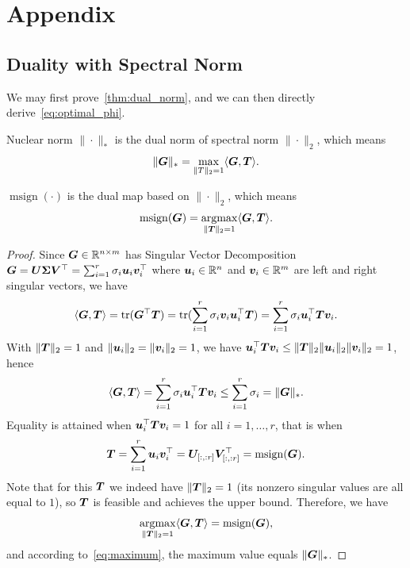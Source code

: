 
\section{Appendix}

\subsection{Duality with Spectral Norm}
\label{app:dual}

We may first prove~\cref{thm:dual_norm}, and we can then directly derive~\cref{eq:optimal_phi}.

\begin{theorem}\label{thm:dual_norm}
    Nuclear norm $\|\!\cdot\!\|_{*}$ is the dual norm of spectral norm $\|\!\cdot\!\|_{2}$,
    which means
    \[
        \|{\bm{G}}\|_{*}=\max_{\|T\|_2=1}\langle {\bm{G}},{\bm{T}}\rangle.
    \]

    $\operatorname{msign}(\cdot)$ is the dual map based on $\|\!\cdot\!\|_{2}$, which
    means
    \[
        \operatorname{msign}({\bm{G}})=\underset{\|{\bm{T}}\|_2=1}{\operatorname*{argmax}}\langle {\bm{G}},{\bm{T}}\rangle.
    \]
\end{theorem}

\begin{proof}
    Since ${\bm{G}} \in {\mathbb{R}}^{n\times m}$ has Singular Vector Decomposition ${\bm{G}} = {\bm{U}} {\bm{\Sigma}}
    {\bm{V}}^{\top}=\sum_{i=1}^{r}{\sigma}_{i}{\bm{u}}_{i}{\bm{v}}_{i}^{\top}$ where ${\bm{u}}_{i}\in{\mathbb{R}}
    ^{n}$ and ${\bm{v}}_{i}\in{\mathbb{R}}^{m}$ are left and right singular vectors, we
    have
    \begin{equation}
        \langle {\bm{G}},{\bm{T}} \rangle = \operatorname{tr}({\bm{G}}^{\top} {\bm{T}})=\operatorname{tr}(\sum_{i=1}^{r} {\sigma}
        _{i} {\bm{v}}_{i} {\bm{u}}_{i}^{\top} {\bm{T}})=\sum_{i=1}^{r} {\sigma}_{i}
        {\bm{u}}_{i}^{\top} {\bm{T}} {\bm{v}}_{i}.
    \end{equation}
    With $\|{\bm{T}}\|_{2}=1$ and $\|{\bm{u}}_{i}\|_{2}=\|{\bm{v}}_{i}\|_{2}=1$, we have ${\bm{u}}_{i}^{\top}
    {\bm{T}} {\bm{v}}_{i} \leq \|{\bm{T}}\|_{2} \|{\bm{u}}_{i}\|_{2}\|{\bm{v}}_{i}\|_{2} = 1$, hence
    \begin{equation}
        \label{eq:maximum}\langle {\bm{G}},{\bm{T}} \rangle=\sum_{i=1}^{r} {\sigma}_{i} {\bm{u}}_{i}^{\top}
        {\bm{T}} {\bm{v}}_{i} \leq \sum_{i=1}^{r} {\sigma}_{i} = \|{\bm{G}}\|_{*}.
    \end{equation}
    Equality is attained when ${\bm{u}}_{i}^{\top} {\bm{T}} {\bm{v}}_{i} = 1$ for all $i=1,\dots,r$, that
    is when
    \begin{equation}
        {\bm{T}} = \sum_{i=1}^{r} {\bm{u}}_{i} {\bm{v}}_{i}^{\top} = {\bm{U}}_{[:,:r]}{\bm{V}}_{[:,:r]}^{\top}=\operatorname{msign}
        ({\bm{G}}).
    \end{equation}
    Note that for this ${\bm{T}}$ we indeed have $\|{\bm{T}}\|_{2}=1$ (its nonzero singular
    values are all equal to $1$), so ${\bm{T}}$ is feasible and achieves the upper
    bound. Therefore, we have
    \begin{equation}
        \underset{\| {\bm{T}} \|_2=1}{\operatorname*{argmax}}\langle {\bm{G}}, {\bm{T}}\rangle =\operatorname{msign}({\bm{G}}),
    \end{equation}
    and according to~\cref{eq:maximum}, the maximum value equals $\|{\bm{G}}\|_{*}$.
\end{proof}



